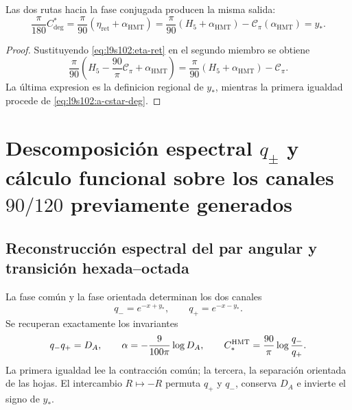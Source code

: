 \begin{theorem}
\label{thm:l9s102:conmutatividad-cstar}
Las dos rutas hacia la fase conjugada producen la misma salida:
\begin{equation}
 \boxed{
 \frac\pi{180}C^*_{\deg}
 =\frac\pi{90}(\eta_{\mathrm{ret}}+\alpha_{\mathrm{HMT}})
 =\frac\pi{90}(H_5+\alpha_{\mathrm{HMT}})
 -\mathscr C_\pi(\alpha_{\mathrm{HMT}})=y_*.}
 \label{eq:l9s102:cuadrado-cstar}
\end{equation}
\end{theorem}

\begin{proof}
Sustituyendo \cref{eq:l9s102:eta-ret} en el segundo miembro se obtiene
\[
 \frac\pi{90}
 \left(H_5-\frac{90}{\pi}\mathscr C_\pi+\alpha_{\mathrm{HMT}}\right)
 =\frac\pi{90}(H_5+\alpha_{\mathrm{HMT}})-\mathscr C_\pi.
\]
La última expresion es la definicion regional de \(y_*\), mientras la
primera igualdad procede de \cref{eq:l9s102:a-cstar-deg}.
\end{proof}

\section{Descomposición espectral \texorpdfstring{\(q_\pm\)}{q+/-} y cálculo funcional sobre los canales \texorpdfstring{\(90/120\)}{90/120} previamente generados}
\label{sec:s102:c38:6}

\subsection{Reconstrucción espectral del par angular y transición hexada--octada}
\label{sec:s102:c38:6:1}


La fase común y la fase orientada determinan los dos canales
\[
q_-=e^{-x+y_*},
\qquad
q_+=e^{-x-y_*}.
\]
Se recuperan exactamente los invariantes
\[
q_-q_+=D_A,
\qquad
\alpha=-\frac9{100\pi}\log D_A,
\qquad
C_*^{\rm HMT}=\frac{90}{\pi}\log\frac{q_-}{q_+}.
\]
La primera igualdad lee la contracción común; la tercera, la separación
orientada de las hojas. El intercambio \(R\mapsto-R\) permuta
\(q_+\) y \(q_-\), conserva \(D_A\) e invierte el signo de \(y_*\).

